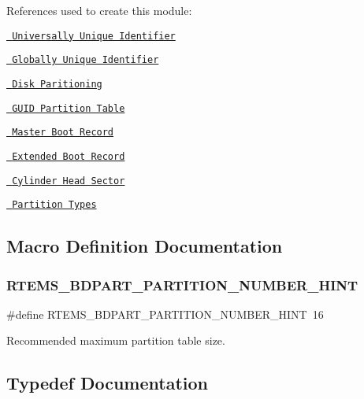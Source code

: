 References used to create this module\+:
\begin{DoxyItemize}
\item \href{http://en.wikipedia.org/wiki/UUID}{\texttt{ Universally Unique Identifier}}
\item \href{http://en.wikipedia.org/wiki/Globally_Unique_Identifier}{\texttt{ Globally Unique Identifier}}
\item \href{http://en.wikipedia.org/wiki/Disk_partitioning}{\texttt{ Disk Paritioning}}
\item \href{http://en.wikipedia.org/wiki/GUID_Partition_Table}{\texttt{ G\+U\+ID Partition Table}}
\item \href{http://en.wikipedia.org/wiki/Master_boot_record}{\texttt{ Master Boot Record}}
\item \href{http://en.wikipedia.org/wiki/Extended_boot_record}{\texttt{ Extended Boot Record}}
\item \href{http://en.wikipedia.org/wiki/Cylinder-head-sector}{\texttt{ Cylinder Head Sector}}
\item \href{http://www.win.tue.nl/~aeb/partitions/partition_types-1.html}{\texttt{ Partition Types}} 
\end{DoxyItemize}

\subsection{Macro Definition Documentation}
\mbox{\label{group__rtems__bdpart_gadd7733262575d66342e79ebafbd3ec78}} 
\subsubsection{\texorpdfstring{RTEMS\_BDPART\_PARTITION\_NUMBER\_HINT}{RTEMS\_BDPART\_PARTITION\_NUMBER\_HINT}}
{\footnotesize\ttfamily \#define R\+T\+E\+M\+S\+\_\+\+B\+D\+P\+A\+R\+T\+\_\+\+P\+A\+R\+T\+I\+T\+I\+O\+N\+\_\+\+N\+U\+M\+B\+E\+R\+\_\+\+H\+I\+NT~16}

Recommended maximum partition table size. 

\subsection{Typedef Documentation}
\mbox{\label{group__rtems__bdpart_ga332cb2d1be444f20c2daa9d7382f8e2c}} 
